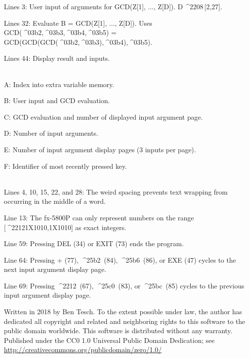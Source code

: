 \documentclass[11pt,letterpaper,twocolumn]{article}
\newcommand{\MINUS}{^^^^2212}
\newcommand{\EXPTEN}{{\scriptsize X10}}
\newcommand{\ELEM}{^^^^2208}
\newcommand{\BETA}{^^^^03b2}
\newcommand{\GAMMA}{^^^^03b3}
\newcommand{\DELTA}{^^^^03b4}
\newcommand{\EPSILON}{^^^^03b5}
\newcommand{\UPTRIANG}{^^^^25b2}
\newcommand{\RIGHTTRIANG}{^^^^25b6}
\newcommand{\DOWNTRIANG}{^^^^25bc}
\newcommand{\LEFTTRIANG}{^^^^25c0}
\begin{document}
Lines 3: User input of arguments for GCD(Z[1], ..., Z[D]). D\,\ELEM \,[2,27].

Lines 32: Evaluate B = GCD(Z[1], ..., Z[D]). Uses GCD(\BETA,\GAMMA,\DELTA,\EPSILON) = GCD(GCD(GCD(\BETA,\GAMMA),\DELTA),\EPSILON).

Lines 44: Display result and inputs.

\\
A: Index into extra variable memory.

B: User input and GCD evaluation.

C: GCD evaluation and number of displayed input argument page.

D: Number of input arguments.

E: Number of input argument display pages (3 inputs per page).

F: Identifier of most recently pressed key.

\\
Lines 4, 10, 15, 22, and 28: The weird spacing prevents text wrapping from occurring in the middle of a word.

Line 13: The fx-5800P can only represent numbers on the range [\MINUS 1\EXPTEN 10,1\EXPTEN 10] as exact integers.

Line 59: Pressing DEL (34) or EXIT (73) ends the program.

Line 64: Pressing + (77), \UPTRIANG ~(84), \RIGHTTRIANG ~(86), or EXE (47) cycles to the next input argument display page.

Line 69: Pressing \MINUS ~(67), \LEFTTRIANG ~(83), or \DOWNTRIANG ~(85) cycles to the previous input argument display page.

\vspace{3ex}
\scriptsize{Written in 2018 by Ben Tesch. To the extent possible under law, the author has dedicated all copyright and related and neighboring rights to this software to the public domain worldwide. This software is distributed without any warranty. Published under the CC0 1.0 Universal Public Domain Dedication; see \url{http://creativecommons.org/publicdomain/zero/1.0/}} 
\end{document}
